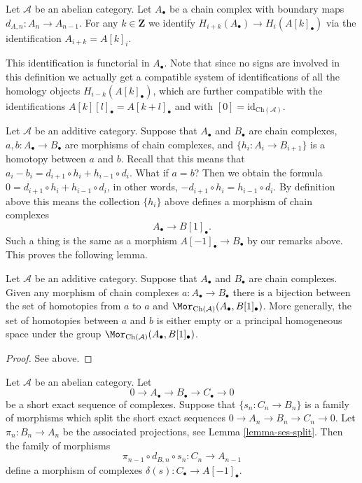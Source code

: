 \begin{definition}
\label{definition-homology-shift}
Let $\mathcal{A}$ be an abelian category.
Let $A_\bullet$ be a chain complex
with boundary maps $d_{A, n} : A_n \to A_{n - 1}$.
For any $k \in \mathbf{Z}$ we identify
{\it $H_{i + k}(A_\bullet) \rightarrow H_i(A[k]_\bullet)$}
via the identification
$A_{i + k} = A[k]_i$.
\end{definition}

\noindent
This identification is functorial in $A_\bullet$.
Note that since no signs are involved in this
definition we actually get a compatible system
of identifications of all the homology
objects $H_{i - k}(A[k]_\bullet)$, which are
further compatible with the identifications
$A[k][l]_\bullet = A[k + l]_\bullet$ and
with $[0] = \text{id}_{\text{Ch}(\mathcal{A})}$.

\medskip\noindent
Let $\mathcal{A}$ be an additive category.
Suppose that $A_\bullet$ and $B_\bullet$ are
chain complexes, $a, b : A_\bullet \to B_\bullet$ are
morphisms of chain complexes, and $\{h_i : A_i \to B_{i + 1}\}$
is a homotopy between $a$ and $b$. Recall that this means
that
$a_i - b_i = d_{i + 1} \circ h_i + h_{i - 1} \circ d_i$.
What if $a = b$? Then we obtain the formula
$0 = d_{i + 1} \circ h_i + h_{i - 1} \circ d_i$,
in other words, $ - d_{i + 1} \circ h_i = h_{i - 1} \circ d_i$.
By definition above this means the collection $\{h_i\}$
above defines a morphism of chain complexes
$$
A_\bullet \longrightarrow B[1]_\bullet.
$$
Such a thing is the same as a morphism $A[-1]_\bullet \to B_\bullet$
by our remarks above. This proves the following lemma.

\begin{lemma}
\label{lemma-homotopy-shift}
Let $\mathcal{A}$ be an additive category.
Suppose that $A_\bullet$ and $B_\bullet$ are
chain complexes. Given any morphism of chain
complexes $a : A_\bullet \to B_\bullet$ there
is a bijection between the set of homotopies
from $a$ to $a$ and
$\Mor_{\text{Ch}(\mathcal{A})}(A_\bullet, B[1]_\bullet)$.
More generally, the set of homotopies between
$a$ and $b$ is either empty or a principal homogeneous
space under the group
$\Mor_{\text{Ch}(\mathcal{A})}(A_\bullet, B[1]_\bullet)$.
\end{lemma}

\begin{proof}
See above.
\end{proof}

\begin{lemma}
\label{lemma-ses-termwise-split}
Let $\mathcal{A}$ be an abelian category.
Let
$$
0 \to A_\bullet \to B_\bullet \to C_\bullet \to 0
$$
be a short exact sequence of complexes.
Suppose that $\{s_n : C_n \to B_n\}$ is a family
of morphisms which split the short exact sequences
$0 \to A_n \to B_n \to C_n \to 0$. Let
$\pi_n : B_n \to A_n$ be the associated
projections, see Lemma \ref{lemma-ses-split}.
Then the family of morphisms
$$
\pi_{n - 1} \circ d_{B, n} \circ s_n
:
C_n \to A_{n - 1}
$$
define a morphism of complexes $\delta(s) : C_\bullet \to A[-1]_\bullet$.
\end{lemma}

